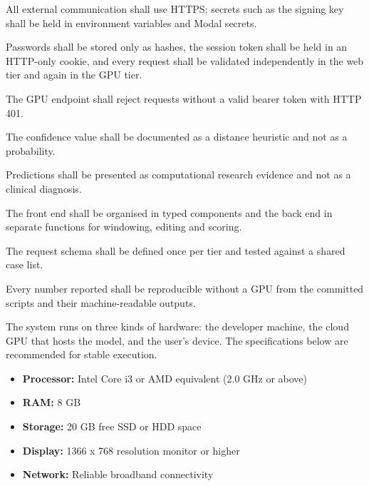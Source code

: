 \begin{subitemize}
\item All external communication shall use HTTPS; secrets such as the signing key shall be held in environment variables and Modal secrets.
\item Passwords shall be stored only as hashes, the session token shall be held in an HTTP-only cookie, and every request shall be validated independently in the web tier and again in the GPU tier.
\item The GPU endpoint shall reject requests without a valid bearer token with HTTP 401.
\end{subitemize}

\begin{subitemize}
\item The confidence value shall be documented as a distance heuristic and not as a probability.
\item Predictions shall be presented as computational research evidence and not as a clinical diagnosis.
\end{subitemize}

\begin{subitemize}
\item The front end shall be organised in typed components and the back end in separate functions for windowing, editing and scoring.
\item The request schema shall be defined once per tier and tested against a shared case list.
\item Every number reported shall be reproducible without a GPU from the committed scripts and their machine-readable outputs.
\end{subitemize}


\vspace{2pt}
The system runs on three kinds of hardware: the developer machine, the cloud GPU that hosts the model, and the user's device. The specifications below are recommended for stable execution.

\vspace{4pt}
\begin{itemize}
\item \textbf{Processor:} Intel Core i3 or AMD equivalent (2.0 GHz or above)
\item \textbf{RAM:} 8 GB
\item \textbf{Storage:} 20 GB free SSD or HDD space
\item \textbf{Display:} 1366 x 768 resolution monitor or higher
\item \textbf{Network:} Reliable broadband connectivity
\end{itemize}

